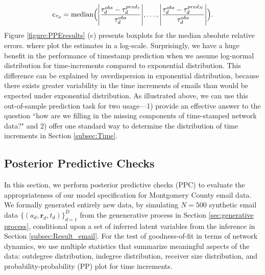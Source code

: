 \documentclass[ba]{imsart}
\def\spacingset#1{\renewcommand{\baselinestretch}%
	{#1}\small\normalsize} \spacingset{1}
\numberwithin{equation}{section}
\theoremstyle{plain}
\DeclarePairedDelimiter\abs{\lvert}{\rvert}
\begin{document}
		\fi
		\begin{equation}
		e_{\tau_d} = \mbox{median}\Big(\abs*{\frac{\tau^{obs}_d - \tau^{pred_1}_{d}}{\tau^{obs}_d}},\ldots, \abs*{\frac{\tau^{obs}_d - \tau^{pred_N}_{d}}{\tau^{obs}_d}}\Big).
		\end{equation}
	Figure \ref{figure:PPEresults} (c) presents boxplots for the median absolute relative errors. where plot the estimates in a log-scale. Surprisingly, we have a huge benefit in the performance of timestamp prediction when we assume log-normal distribution for time-increments compared to exponential distribution. This difference can be explained by overdispersion in exponential distribution, because there exists greater variability in the time increments of emails than would be expected under exponential distribution. As illustrated above, we can use this out-of-sample prediction task for two usage---1) provide an effective answer to the question ``how are we filling in the missing components of time-stamped network data?" and 2) offer one standard way to determine the distribution of time increments in Section \ref{subsec:Time}. 

	\subsection{Posterior Predictive Checks}\label{subsec:PPC_email} 	   
In this section, we perform posterior predictive checks (PPC) \citep{rubin1984bayesianly} to evaluate the appropriateness of our model specification for Montgomery County email data. We formally generated entirely new data, by simulating $N=500$ synthetic email data $\{(a_{d}, \boldsymbol{r}_{d}, t_{d})\}_{d=1}^D$ from the genenerative process in Section \ref{sec:generative process}, conditional upon a set of inferred latent variables from the inference in Section \ref{subsec:Result_email}. For the test of goodness-of-fit in terms of network dynamics, we use multiple statistics that summarize meaningful aspects of the data: outdegree distribution, indegree distribution, receiver size distribution, and probability-probability (PP) plot for time increments. 

		
\end{document}
